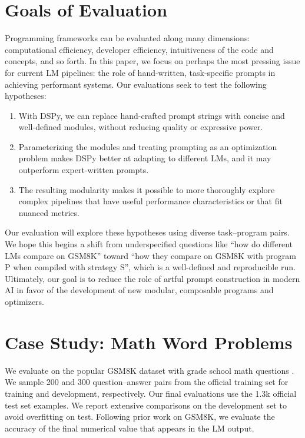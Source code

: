 \section{Goals of Evaluation}\label{sec:evaluation:goals}

Programming frameworks can be evaluated along many dimensions: computational efficiency, developer efficiency, intuitiveness of the code and concepts, and so forth. In this paper, we focus on perhaps the most pressing issue for current LM pipelines: the role of hand-written, task-specific prompts in achieving performant systems. Our evaluations seek to test the following hypotheses:


\begin{enumerate}[label=\textbf{H\arabic*},itemsep=0pt, topsep=0pt]
\item With DSPy, we can replace hand-crafted prompt strings with concise and well-defined modules, without reducing quality or expressive power.

\item Parameterizing the modules and treating prompting as an optimization problem makes DSPy better at adapting to different LMs, and it may outperform expert-written prompts. %

\item The resulting modularity makes it possible to more thoroughly explore complex pipelines that have useful performance characteristics or that fit nuanced metrics. 

\end{enumerate}


Our evaluation will explore these hypotheses using diverse task--program pairs. We hope this begins a shift from underspecified questions like ``how do different LMs compare on GSM8K'' toward ``how they compare on GSM8K with program P when compiled with strategy S'', which is a well-defined and reproducible run. %
Ultimately, our goal is to reduce the role of artful prompt construction in modern AI in favor of the development of new modular, composable programs and optimizers.



\section{Case Study: Math Word Problems}\label{sec:mw}


We evaluate on the popular GSM8K dataset with grade school math questions \citep{cobbe2021training}. We sample 200 and 300 question--answer pairs from the official training set for training and development, respectively. Our final evaluations use the 1.3k official test set examples. We report extensive comparisons on the development set to avoid overfitting on test. Following prior work on GSM8K, we evaluate the accuracy of the final numerical value that appears in the LM output.




